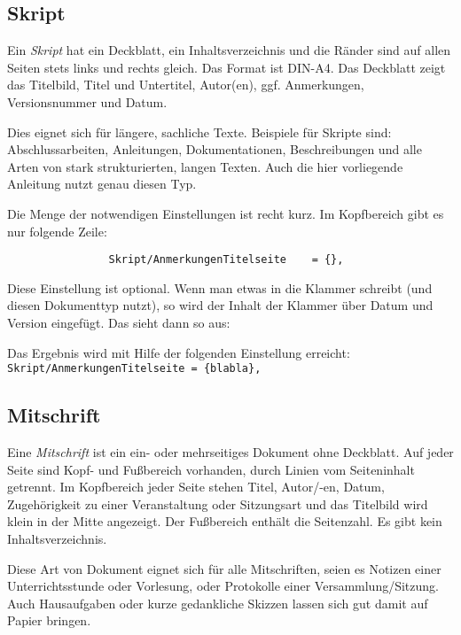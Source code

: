 			\subsection{Skript}
			
				Ein \emph{Skript} hat ein Deckblatt, ein Inhaltsverzeichnis und die Ränder sind auf allen Seiten stets links und rechts gleich. Das Format ist DIN-A4. Das Deckblatt zeigt das Titelbild, Titel und Untertitel, Autor(en), ggf. Anmerkungen, Versionsnummer und Datum.
				
				Dies eignet sich für längere, sachliche Texte. Beispiele für Skripte sind: Abschlussarbeiten, Anleitungen, Dokumentationen, Beschreibungen und alle Arten von stark strukturierten, langen Texten. Auch die hier vorliegende Anleitung nutzt genau diesen Typ. 
				
				Die Menge der notwendigen Einstellungen ist recht kurz. Im Kopfbereich gibt es nur folgende Zeile: 
				
				\begin{verbatim}
				Skript/AnmerkungenTitelseite 	= {},
				\end{verbatim}
				
				Diese Einstellung ist optional. Wenn man etwas in die Klammer schreibt (und diesen Dokumenttyp nutzt), so wird der Inhalt der Klammer über Datum und Version eingefügt. Das sieht dann so aus: 
				
				\begin{center}
				\end{center}
				
				Das Ergebnis wird mit Hilfe der folgenden Einstellung erreicht: \\
				\texttt{Skript/AnmerkungenTitelseite = \{blabla\},}
				
			\subsection{Mitschrift}
			
				Eine \emph{Mitschrift} ist ein ein- oder mehrseitiges Dokument ohne Deckblatt. Auf jeder Seite sind Kopf- und Fußbereich vorhanden, durch Linien vom Seiteninhalt getrennt. Im Kopfbereich jeder Seite stehen Titel, Autor/-en, Datum, Zugehörigkeit zu einer Veranstaltung oder Sitzungsart und das Titelbild wird klein in der Mitte angezeigt. Der Fußbereich enthält die Seitenzahl. Es gibt kein Inhaltsverzeichnis. 
				
				Diese Art von Dokument eignet sich für alle Mitschriften, seien es Notizen einer Unterrichtsstunde oder Vorlesung, oder Protokolle einer Versammlung/Sitzung. Auch Hausaufgaben oder kurze gedankliche Skizzen lassen sich gut damit auf Papier bringen. 
				
